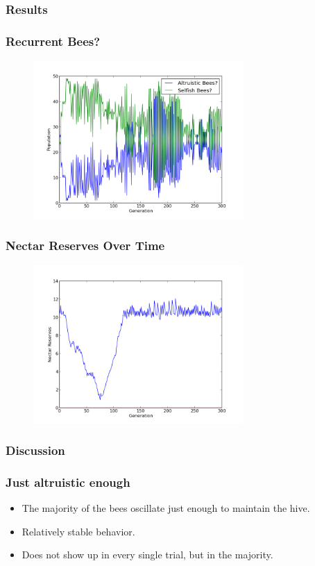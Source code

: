 \documentclass{beamer}
\begin{document}
      \subsubsection{Results} %
      \label{ssub:results}
         \begin{frame}[t]\frametitle{Recurrent Bees?}
          \begin{figure}
          \includegraphics[width=8cm]{results/recurrent_bees.png}
          \end{figure}
        \end{frame}

        \begin{frame}[t]\frametitle{Nectar Reserves Over Time}
          \begin{figure}
          \includegraphics[width=8cm]{results/recurrent_bees_nectar.png}
          \end{figure}
        \end{frame}

      \subsubsection{Discussion} %
      \label{ssub:discussion}
        \begin{frame}[c]\frametitle{Just altruistic enough}
            
          \begin{itemize}
            \item The majority of the bees oscillate just enough to maintain 
                  the hive.
            \item Relatively stable behavior.
            \item Does not show up in every single trial, but in the majority.
          \end{itemize}
        
        \end{frame}
\end{document}
